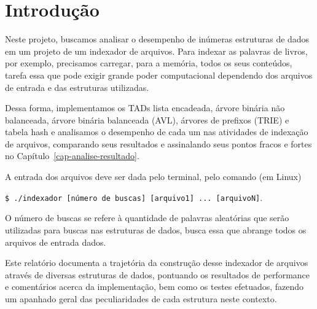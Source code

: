\chapter*[Introdução]{Introdução}\label{cap-introducao} %

Neste projeto, buscamos analisar o desempenho de inúmeras estruturas de dados em um projeto de um indexador de arquivos. Para indexar as palavras de livros, por exemplo, precisamos carregar, para a memória, todos os seus conteúdos, tarefa essa que pode exigir grande poder computacional dependendo dos arquivos de entrada e das estruturas utilizadas. 

Dessa forma, implementamos os TADs lista encadeada, árvore binária não balanceada, árvore binária balanceada (AVL), árvores de prefixos (TRIE) e tabela hash e analisamos o desempenho de cada um nas atividades de indexação de arquivos, comparando seus resultados e assinalando seus pontos fracos e fortes no Capítulo~\ref{cap-analise-resultado}.

A entrada dos arquivos deve ser dada pelo terminal, pelo comando (em Linux)

\texttt{\$ ./indexador [número de buscas] [arquivo1] ... [arquivoN]}.

\noindent O número de buscas se refere à quantidade de palavras aleatórias que serão utilizadas para buscas nas estruturas de dados, busca essa que abrange todos os arquivos de entrada dados.

Este relatório documenta a trajetória da construção desse indexador de arquivos através de diversas estruturas de dados, pontuando os resultados de performance e comentários acerca da implementação, bem como os testes efetuados, fazendo um apanhado geral das peculiaridades de cada estrutura neste contexto.

